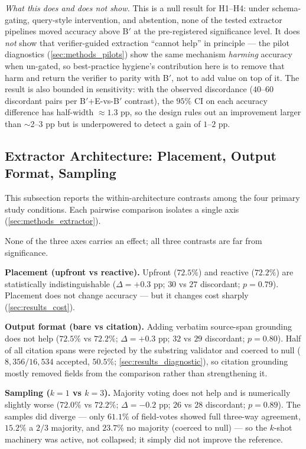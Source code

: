 \textit{What this does and does not show.} This is a null result for
H1--H4: under schema-gating, query-style intervention, and abstention,
none of the tested extractor pipelines moved accuracy above B$'$ at the
pre-registered significance level. It does \emph{not} show that
verifier-guided extraction ``cannot help'' in principle --- the pilot
diagnostics (\cref{sec:methods_pilots}) show the same mechanism
\emph{harming} accuracy when un-gated, so best-practice hygiene's
contribution here is to remove that harm and return the verifier to
parity with B$'$, not to add value on top of it. The result is also
bounded in sensitivity: with the observed discordance ($40$--$60$
discordant pairs per B$'$+E-vs-B$'$ contrast), the $95\%$ CI on each
accuracy difference has half-width $\approx 1.3$ pp, so the design
rules out an improvement larger than $\sim$2--3 pp but is underpowered
to detect a gain of $1$--$2$ pp.

\FloatBarrier
\subsection{Extractor Architecture: Placement, Output Format, Sampling}
\label{sec:results_architecture}

This subsection reports the within-architecture contrasts among the
four primary study conditions. Each pairwise comparison isolates a
single axis (\cref{sec:methods_extractor}).

None of the three axes carries an effect; all three contrasts are far
from significance.

\textbf{Placement (upfront vs reactive).} Upfront ($72.5\%$) and
reactive ($72.2\%$) are statistically indistinguishable
($\Delta = +0.3$ pp; $30$ vs $27$ discordant; $p = 0.79$). Placement
does not change accuracy --- but it changes cost sharply
(\cref{sec:results_cost}).

\textbf{Output format (bare vs citation).} Adding verbatim source-span
grounding does not help ($72.5\%$ vs $72.2\%$; $\Delta = +0.3$ pp;
$32$ vs $29$ discordant; $p = 0.80$). Half of all citation spans were
rejected by the substring validator and coerced to null
($8{,}356/16{,}534$ accepted, $50.5\%$; \cref{sec:results_diagnostic}),
so citation grounding mostly removed fields from the comparison rather
than strengthening it.

\textbf{Sampling ($k=1$ vs $k=3$).} Majority voting does not help and is
numerically slightly worse ($72.0\%$ vs $72.2\%$; $\Delta = -0.2$ pp;
$26$ vs $28$ discordant; $p = 0.89$). The samples did diverge --- only
$61.1\%$ of field-votes showed full three-way agreement, $15.2\%$ a
$2/3$ majority, and $23.7\%$ no majority (coerced to null) --- so the
$k$-shot machinery was active, not collapsed; it simply did not improve
the reference.

